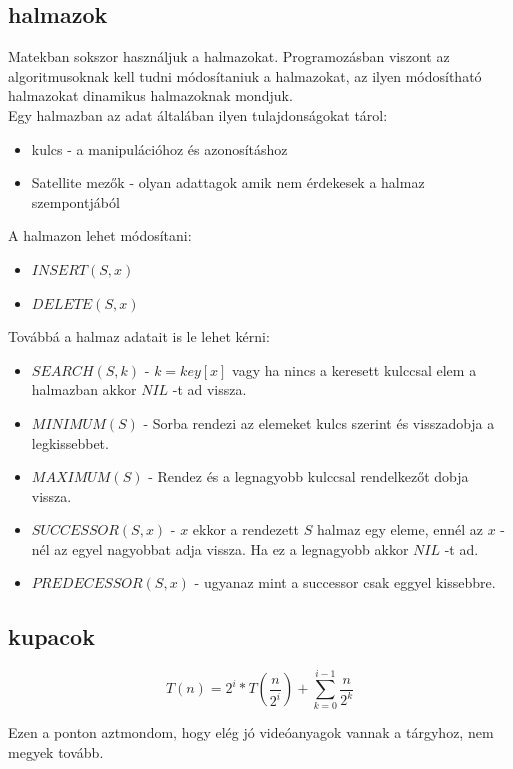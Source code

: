\documentclass{article}
\theoremstyle{mytheoremstyle}
\theoremstyle{mytheoremstyle}
\theoremstyle{myproblemstyle}
\begin{document}
\subsection{halmazok}
Matekban sokszor használjuk a halmazokat. 
Programozásban viszont az algoritmusoknak kell tudni módosítaniuk 
a halmazokat, az ilyen módosítható halmazokat dinamikus 
halmazoknak mondjuk.\\
Egy halmazban az adat általában ilyen tulajdonságokat tárol:
\begin{itemize}
    \item kulcs - a manipulációhoz és azonosításhoz
    \item Satellite mezők - olyan adattagok amik nem érdekesek a 
    halmaz szempontjából 
\end{itemize} 
A halmazon lehet módosítani:
\begin{itemize}
    \item $INSERT(S,x)$
    \item $DELETE(S,x)$
\end{itemize}
Továbbá a halmaz adatait is le lehet kérni:
\begin{itemize}
    \item $SEARCH(S,k)$ - $k = key[x]$ vagy ha nincs a keresett kulccsal elem a halmazban akkor $NIL$ -t ad vissza.
    \item $MINIMUM(S)$ - Sorba rendezi az elemeket kulcs szerint és visszadobja a legkissebbet.
    \item $MAXIMUM(S)$ - Rendez és a legnagyobb kulccsal rendelkezőt dobja vissza.
    \item $SUCCESSOR(S,x)$ - $x$ ekkor a rendezett $S$ halmaz egy eleme, 
    ennél az $x$ -nél az egyel nagyobbat adja vissza. Ha ez a legnagyobb akkor $NIL$ -t ad.
    \item $PREDECESSOR(S,x)$ - ugyanaz mint a successor csak eggyel kissebbre.
\end{itemize}
\subsection{kupacok}

$$T(n)=2^i*T\left(\frac{n}{2^i}\right)+\sum_{k=0}^{i-1}\frac{n}{2^k}$$

Ezen a ponton aztmondom, hogy elég jó videóanyagok vannak a tárgyhoz, nem megyek tovább.
\end{document}
